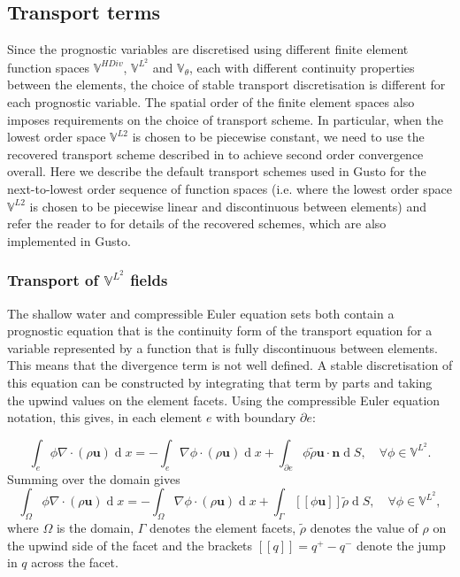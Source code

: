 \documentclass[journal abbreviation, manuscript]{copernicus}
\def\MM#1{\boldsymbol{#1}}
\DeclareMathOperator{\diff}{d}
\newcommand{\jump}[1]{[\![#1]\!]}
\begin{document}
\subsection{Transport terms}
\label{sec: transport}
Since the prognostic variables are discretised using different finite
element function spaces $\mathbb{V}^{HDiv}$, $\mathbb{V}^{L^2}$ and
$\mathbb{V}_\theta$, each with different continuity properties between
the elements, the choice of stable transport discretisation is
different for each prognostic variable. The spatial order of the
finite element spaces also imposes requirements on the choice of
transport scheme. In particular, when the lowest order space
$\mathbb{V}^{L2}$ is chosen to be piecewise constant, we need to use
the recovered transport scheme described in
\citet{bendall2019recovered} to achieve second order convergence
overall. Here we describe the default transport schemes used in Gusto
for the next-to-lowest order sequence of function spaces (i.e. where
the lowest order space $\mathbb{V}^{L2}$ is chosen to be piecewise
linear and discontinuous between elements) and refer the reader to
\citet{bendall2019recovered} for details of the recovered schemes,
which are also implemented in Gusto.

\subsubsection{Transport of $\mathbb{V}^{L^2}$ fields}
\label{subsec: DG transport}
The shallow water and compressible Euler equation sets both contain a
prognostic equation that is the continuity form of the transport
equation for a variable represented by a function that is fully
discontinuous between elements. This means that the divergence term is
not well defined. A stable discretisation of this equation can be
constructed by integrating that term by parts and taking the upwind
values on the element facets. Using the compressible Euler equation
notation, this gives, in each element $e$ with boundary $\partial e$:

\begin{equation}
  \int_e \phi\nabla\cdot(\rho\MM{u}) \diff x = -\int_e \nabla\phi \cdot (\rho\MM{u}) \diff x + \int_{\partial e} \phi\tilde{\rho}\MM{u}\cdot\MM{n} \diff S, \quad \forall \phi \in \mathbb{V}^{L^2}.
\end{equation}
Summing over the domain gives
\begin{equation}
  \int_\Omega \phi\nabla\cdot(\rho\MM{u}) \diff x = -\int_\Omega \nabla\phi \cdot (\rho\MM{u}) \diff x + \int_\Gamma \jump{\phi\MM{u}}\tilde{\rho} \diff S, \quad \forall \phi \in \mathbb{V}^{L^2},
\end{equation}
where $\Omega$ is the domain, $\Gamma$ denotes the element facets,
$\tilde{\rho}$ denotes the value of $\rho$ on the upwind side of the
facet and the brackets $\jump{q} = q^+-q^-$ denote the jump in $q$
across the facet.
\end{document}

